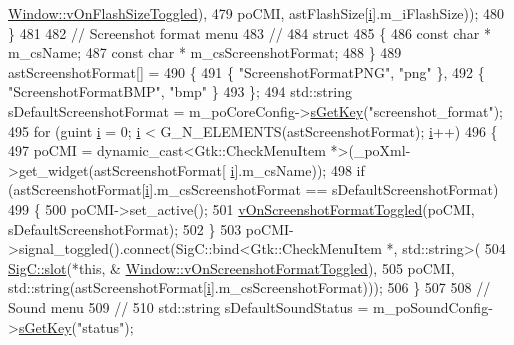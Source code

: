 \begin{DoxyCode}
{{      \mbox{\hyperlink{class_v_b_a_1_1_window_a592d046d6e85921562d26285387cc45a}{Window::vOnFlashSizeToggled}}),
479                                       poCMI, astFlashSize[\mbox{\hyperlink{expr-lex_8cpp_acb559820d9ca11295b4500f179ef6392}{i}}].m\_iFlashSize));
480   \}
481 
482   \textcolor{comment}{// Screenshot format menu}
483   \textcolor{comment}{//}
484   \textcolor{keyword}{struct}
485   \{
486     \textcolor{keyword}{const} \textcolor{keywordtype}{char} * m\_csName;
487     \textcolor{keyword}{const} \textcolor{keywordtype}{char} * m\_csScreenshotFormat;
488   \}
489   astScreenshotFormat[] =
490   \{
491     \{ \textcolor{stringliteral}{"ScreenshotFormatPNG"}, \textcolor{stringliteral}{"png"} \},
492     \{ \textcolor{stringliteral}{"ScreenshotFormatBMP"}, \textcolor{stringliteral}{"bmp"} \}
493   \};
494   std::string sDefaultScreenshotFormat = m\_poCoreConfig->\mbox{\hyperlink{class_v_b_a_1_1_config_1_1_section_a7ac9dfabf38bc1db83a6017e130f04ac}{sGetKey}}(\textcolor{stringliteral}{"screenshot\_format"});
495   \textcolor{keywordflow}{for} (guint \mbox{\hyperlink{expr-lex_8cpp_acb559820d9ca11295b4500f179ef6392}{i}} = 0; \mbox{\hyperlink{expr-lex_8cpp_acb559820d9ca11295b4500f179ef6392}{i}} < G\_N\_ELEMENTS(astScreenshotFormat); \mbox{\hyperlink{expr-lex_8cpp_acb559820d9ca11295b4500f179ef6392}{i}}++)
496   \{
497     poCMI = \textcolor{keyword}{dynamic\_cast<}Gtk::CheckMenuItem *\textcolor{keyword}{>}(\_poXml->get\_widget(astScreenshotFormat[
      \mbox{\hyperlink{expr-lex_8cpp_acb559820d9ca11295b4500f179ef6392}{i}}].m\_csName));
498     \textcolor{keywordflow}{if} (astScreenshotFormat[\mbox{\hyperlink{expr-lex_8cpp_acb559820d9ca11295b4500f179ef6392}{i}}].m\_csScreenshotFormat == sDefaultScreenshotFormat)
499     \{
500       poCMI->set\_active();
501       \mbox{\hyperlink{class_v_b_a_1_1_window_a8536700b1c3ab6cd07b8fd14bf3d3d82}{vOnScreenshotFormatToggled}}(poCMI, sDefaultScreenshotFormat);
502     \}
503     poCMI->signal\_toggled().connect(SigC::bind<Gtk::CheckMenuItem *, std::string>(
504                                       \mbox{\hyperlink{namespace_sig_c_a92e4f19202b77e78ac1db05f5a62f6b6}{SigC::slot}}(*\textcolor{keyword}{this}, &
      \mbox{\hyperlink{class_v_b_a_1_1_window_a8536700b1c3ab6cd07b8fd14bf3d3d82}{Window::vOnScreenshotFormatToggled}}),
505                                       poCMI, std::string(astScreenshotFormat[\mbox{\hyperlink{expr-lex_8cpp_acb559820d9ca11295b4500f179ef6392}{i}}].m\_csScreenshotFormat)));
506   \}
507 
508   \textcolor{comment}{// Sound menu}
509   \textcolor{comment}{//}
510   std::string sDefaultSoundStatus = m\_poSoundConfig->\mbox{\hyperlink{class_v_b_a_1_1_config_1_1_section_a7ac9dfabf38bc1db83a6017e130f04ac}{sGetKey}}(\textcolor{stringliteral}{"status"});
}}
\end{DoxyCode}
